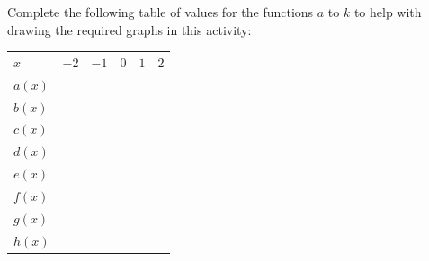 Complete the following table of values for the functions $a$ to $k$ to help with drawing the required graphs in this activity:\par 
\begin{table}[H]
\begin{center}
\label{m39345*id240930}
\noindent
{}
\tablelasttail{}
\begin{xtabular}[t]{|l|l|l|l|l|l|}\hline
    $x$
    &
    $-2$
    &
    $-1$
    &
    $0$
    &
    $1$
    &
    $2$
\tabularnewline{}
    $a(x)$
    &
&
&
&
&
\tabularnewline{}
    $b(x)$
    &
&
&
&
&
\tabularnewline{}
    $c(x)$
    &
&
&
&
&
\tabularnewline{}
    $d(x)$
    &
&
&
&
&
\tabularnewline{}
    $e(x)$
    &
&
&
&
&
\tabularnewline{}
    $f(x)$
    &
&
&
&
&
\tabularnewline{}
    $g(x)$
    &
&
&
&
&
\tabularnewline{}
    $h(x)$
    &
&
&
&
&
\tabularnewline{}

\end{xtabular}
\end{center}
\end{table}
